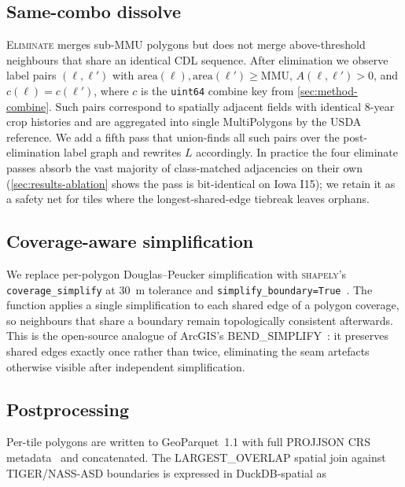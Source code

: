 \documentclass[preprint,12pt]{elsarticle}
\begin{document}
\subsection{Same-combo dissolve}
\label{sec:method-dissolve}

\textsc{Eliminate} merges sub-MMU polygons but does not merge
above-threshold neighbours that share an identical CDL sequence. After
elimination we observe label pairs $(\ell, \ell')$ with
$\text{area}(\ell), \text{area}(\ell') \geq \text{MMU}$,
$A(\ell, \ell') > 0$, and $c(\ell) = c(\ell')$, where $c$ is the
\texttt{uint64} combine key from \cref{sec:method-combine}. Such pairs
correspond to spatially adjacent fields with identical 8-year crop
histories and are aggregated into single MultiPolygons by the USDA
reference. We add a fifth pass that union-finds all such pairs over
the post-elimination label graph and rewrites $L$ accordingly. In
practice the four eliminate passes absorb the vast majority of
class-matched adjacencies on their own (\cref{sec:results-ablation}
shows the pass is bit-identical on Iowa I15); we retain it as a safety
net for tiles where the longest-shared-edge tiebreak leaves orphans.

\subsection{Coverage-aware simplification}
\label{sec:method-simplify}

We replace per-polygon Douglas--Peucker simplification with
\textsc{shapely}'s \texttt{coverage\_simplify} at 30~m tolerance and
\texttt{simplify\_boundary=True}~\cite{shapely}. The function applies a
single simplification to each shared edge of a polygon coverage, so
neighbours that share a boundary remain topologically consistent
afterwards. This is the open-source analogue of ArcGIS's
\textsc{BEND\_SIMPLIFY}~\cite{wang1998bend}: it preserves shared edges
exactly once rather than twice, eliminating the seam artefacts
otherwise visible after independent simplification.

\subsection{Postprocessing}
\label{sec:method-postprocess}

Per-tile polygons are written to GeoParquet~1.1 with full PROJJSON CRS
metadata~\cite{geoparquet,kelsey2023geoparquet} and concatenated. The
\textsc{LARGEST\_OVERLAP} spatial join against TIGER/NASS-ASD
boundaries is expressed in DuckDB-spatial as
\end{document}
